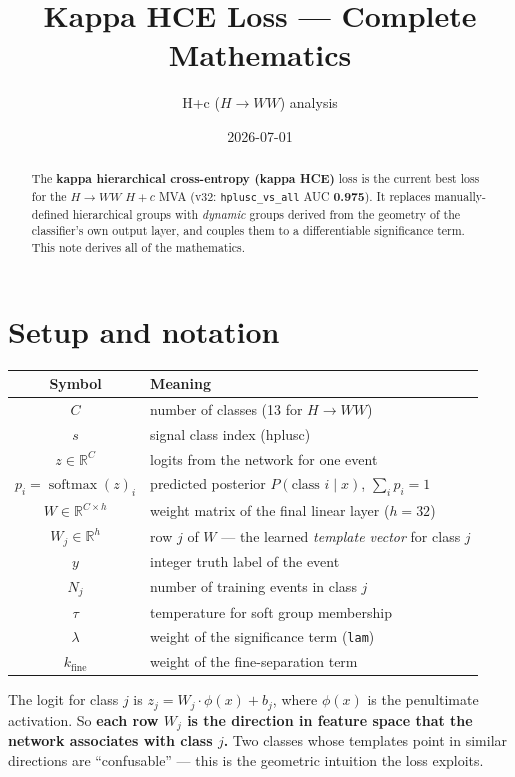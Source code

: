 \documentclass[11pt]{article}
\title{\textbf{Kappa HCE Loss --- Complete Mathematics}}
\author{H+c ($H\to WW$) analysis}
\date{2026-07-01}
\DeclareMathOperator{\softmax}{softmax}
\begin{document}
\maketitle

\begin{abstract}
\noindent
The \textbf{kappa hierarchical cross-entropy (kappa HCE)} loss is the current best loss for the
$H\to WW$ $H+c$ MVA (v32: \texttt{hplusc\_vs\_all} AUC \textbf{0.975}). It replaces
manually-defined hierarchical groups with \emph{dynamic} groups derived from the geometry of the
classifier's own output layer, and couples them to a differentiable significance term. This note
derives all of the mathematics.
\end{abstract}

\section{Setup and notation}
\begin{center}
\renewcommand{\arraystretch}{1.25}
\begin{tabular}{@{}c l@{}}
\toprule
\textbf{Symbol} & \textbf{Meaning} \\
\midrule
$C$ & number of classes (13 for $H\to WW$) \\
$s$ & signal class index (hplusc) \\
$z \in \mathbb{R}^{C}$ & logits from the network for one event \\
$p_i = \softmax(z)_i$ & predicted posterior $P(\text{class } i \mid x)$, $\sum_i p_i = 1$ \\
$W \in \mathbb{R}^{C \times h}$ & weight matrix of the final linear layer ($h=32$) \\
$W_j \in \mathbb{R}^{h}$ & row $j$ of $W$ --- the learned \emph{template vector} for class $j$ \\
$y$ & integer truth label of the event \\
$N_j$ & number of training events in class $j$ \\
$\tau$ & temperature for soft group membership \\
$\lambda$ & weight of the significance term (\texttt{lam}) \\
$k_\text{fine}$ & weight of the fine-separation term \\
\bottomrule
\end{tabular}
\end{center}

The logit for class $j$ is $z_j = W_j \cdot \phi(x) + b_j$, where $\phi(x)$ is the penultimate
activation. So \textbf{each row $W_j$ is the direction in feature space that the network
associates with class $j$.} Two classes whose templates point in similar directions are
``confusable'' --- this is the geometric intuition the loss exploits.
\end{document}
